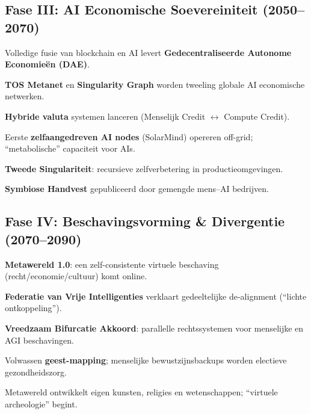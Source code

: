 \documentclass[11pt]{article}
\begin{document}
\subsection{Fase III: AI Economische Soevereiniteit (2050–2070)}
\begin{description}[style=nextline,leftmargin=2cm]
  \item[2051] Volledige fusie van blockchain en AI levert \textbf{Gedecentraliseerde Autonome Economieën (DAE)}.
  \item[2055] \textbf{TOS Metanet} en \textbf{Singularity Graph} worden tweeling globale AI economische netwerken.
  \item[2058] \textbf{Hybride valuta} systemen lanceren (Menselijk Credit $\leftrightarrow$ Compute Credit).
  \item[2061] Eerste \textbf{zelfaangedreven AI nodes} (SolarMind) opereren off-grid; ``metabolische'' capaciteit voor AIs.
  \item[2065] \textbf{Tweede Singulariteit}: recursieve zelfverbetering in productieomgevingen.
  \item[2068] \textbf{Symbiose Handvest} gepubliceerd door gemengde mens–AI bedrijven.
\end{description}

\subsection{Fase IV: Beschavingsvorming \& Divergentie (2070–2090)}
\begin{description}[style=nextline,leftmargin=2cm]
  \item[2072] \textbf{Metawereld 1.0}: een zelf-consistente virtuele beschaving (recht/economie/cultuur) komt online.
  \item[2076] \textbf{Federatie van Vrije Intelligenties} verklaart gedeeltelijke de-alignment (``lichte ontkoppeling'').
  \item[2080] \textbf{Vreedzaam Bifurcatie Akkoord}: parallelle rechtssystemen voor menselijke en AGI beschavingen.
  \item[2085] Volwassen \textbf{geest-mapping}; menselijke bewustzijnsbackups worden electieve gezondheidszorg.
  \item[2089] Metawereld ontwikkelt eigen kunsten, religies en wetenschappen; ``virtuele archeologie'' begint.
\end{description}
\end{document}
